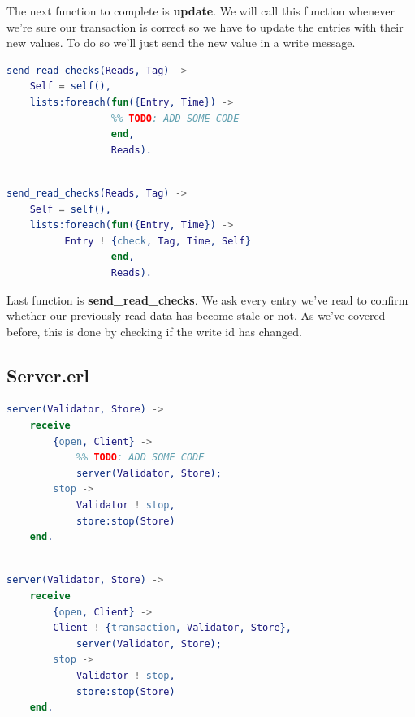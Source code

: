 \documentclass[a4paper, 10pt]{article}
\begin{document}
  The next function to complete is \textbf{update}. We will call this function whenever we're sure our transaction is correct so we have to update the entries with their new values. To do so we'll just send the new value in a write message.


\begin{minipage}{.45\textwidth}
	\begin{lstlisting}[language=erlang, caption={Template}]
send_read_checks(Reads, Tag) ->
    Self = self(),
    lists:foreach(fun({Entry, Time}) -> 
                  %% TODO: ADD SOME CODE
                  end, 
                  Reads).
 	\end{lstlisting}
    \end{minipage}\hfill
    \begin{minipage}{.45\textwidth}
	\begin{lstlisting}[language=erlang, caption={Filled version}]

send_read_checks(Reads, Tag) ->
    Self = self(),
    lists:foreach(fun({Entry, Time}) -> 
		  Entry ! {check, Tag, Time, Self}
                  end, 
                  Reads).
  	\end{lstlisting}
  \end{minipage}

Last function is \textbf{send\_read\_checks}. We ask every entry we've read to confirm whether our previously read data has become stale or not. As we've covered before, this is done by checking if the write id has changed.

\clearpage

\subsection{Server.erl}

\begin{minipage}{.45\textwidth}
	\begin{lstlisting}[language=erlang, caption={Template}]
server(Validator, Store) ->
    receive 
        {open, Client} ->
            %% TODO: ADD SOME CODE
            server(Validator, Store);
        stop ->
            Validator ! stop,
            store:stop(Store)
    end.
 	\end{lstlisting}
    \end{minipage}\hfill
    \begin{minipage}{.45\textwidth}
	\begin{lstlisting}[language=erlang, caption={Filled version}]

server(Validator, Store) ->
    receive 
        {open, Client} ->
	    Client ! {transaction, Validator, Store},
            server(Validator, Store);
        stop ->
            Validator ! stop,
            store:stop(Store)
    end.
  	\end{lstlisting}
  \end{minipage}
\end{document}
